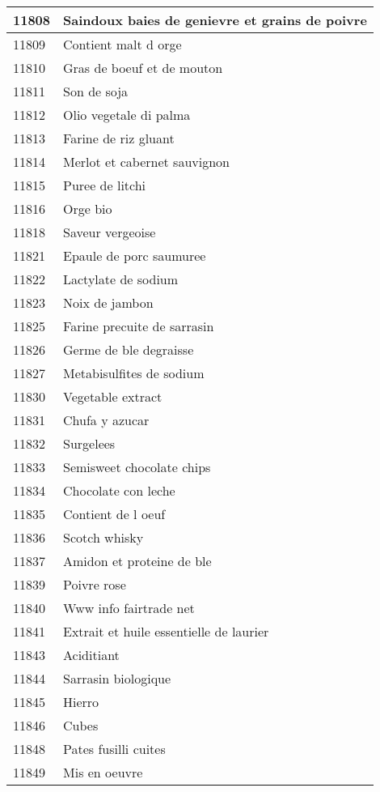 \begin{longtable}{|l|l|}
11808 & Saindoux baies de genievre et grains de poivre \\ \hline 
11809 & Contient malt d orge \\ \hline 
11810 & Gras de boeuf et de mouton \\ \hline 
11811 & Son de soja \\ \hline 
11812 & Olio vegetale di palma \\ \hline 
11813 & Farine de riz gluant \\ \hline 
11814 & Merlot et cabernet sauvignon \\ \hline 
11815 & Puree de litchi \\ \hline 
11816 & Orge bio \\ \hline 
11818 & Saveur vergeoise \\ \hline 
11821 & Epaule de porc saumuree \\ \hline 
11822 & Lactylate de sodium \\ \hline 
11823 & Noix de jambon \\ \hline 
11825 & Farine precuite de sarrasin \\ \hline 
11826 & Germe de ble degraisse \\ \hline 
11827 & Metabisulfites de sodium \\ \hline 
11830 & Vegetable extract \\ \hline 
11831 & Chufa y azucar \\ \hline 
11832 & Surgelees \\ \hline 
11833 & Semisweet chocolate chips \\ \hline 
11834 & Chocolate con leche \\ \hline 
11835 & Contient de l oeuf \\ \hline 
11836 & Scotch whisky \\ \hline 
11837 & Amidon et proteine de ble \\ \hline 
11839 & Poivre rose \\ \hline 
11840 & Www info fairtrade net \\ \hline 
11841 & Extrait et huile essentielle de laurier \\ \hline 
11843 & Aciditiant \\ \hline 
11844 & Sarrasin biologique \\ \hline 
11845 & Hierro \\ \hline 
11846 & Cubes \\ \hline 
11848 & Pates fusilli cuites \\ \hline 
11849 & Mis en oeuvre \\ \hline 

\end{longtable}
